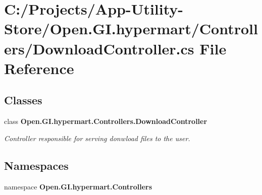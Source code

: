 \section{C\+:/\+Projects/\+App-\/\+Utility-\/\+Store/\+Open.G\+I.\+hypermart/\+Controllers/\+Download\+Controller.cs File Reference}
\label{_download_controller_8cs}
\subsection*{Classes}
\begin{DoxyCompactItemize}
\item 
class \textbf{ Open.\+G\+I.\+hypermart.\+Controllers.\+Download\+Controller}
\begin{DoxyCompactList}\small\item\em Controller responsible for serving donwload files to the user. \end{DoxyCompactList}\end{DoxyCompactItemize}
\subsection*{Namespaces}
\begin{DoxyCompactItemize}
\item 
namespace \textbf{ Open.\+G\+I.\+hypermart.\+Controllers}
\end{DoxyCompactItemize}

